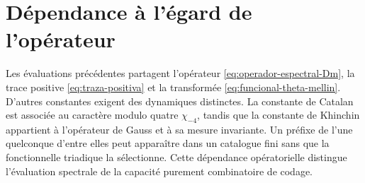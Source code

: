 \section{Dépendance à l'égard de l'opérateur}

Les évaluations précédentes partagent l'opérateur
\eqref{eq:operador-espectral-Dm}, la trace positive
\eqref{eq:traza-positiva} et la transformée
\eqref{eq:funcional-theta-mellin}. D'autres constantes exigent des dynamiques
distinctes. La constante de Catalan est associée au caractère modulo quatre
$\chi_{-4}$, tandis que la constante de Khinchin appartient à l'opérateur de
Gauss et à sa mesure invariante. Un préfixe de l'une quelconque d'entre elles peut
apparaître dans un catalogue fini sans que la fonctionnelle triadique la sélectionne.
Cette dépendance opératorielle distingue l'évaluation spectrale de la
capacité purement combinatoire de codage.
